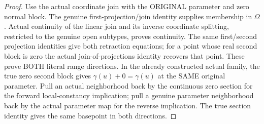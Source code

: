 \begin{proof}
Use the actual coordinate join with the ORIGINAL parameter and zero normal
block. The genuine first-projection/join identity supplies membership in
$\Omega$. Actual continuity of the linear join and its inverse coordinate
splitting, restricted to the genuine open subtypes, proves continuity.
The same first/second projection identities give both retraction equations;
for a point whose real second block is zero the actual join-of-projections
identity recovers that point. These prove BOTH literal range directions.
In the already constructed actual family, the true zero second block gives
$\gamma(u)+0=\gamma(u)$ at the SAME original parameter. Pull an actual neighborhood back by the
continuous zero section for the forward local-constancy implication; pull
a genuine parameter neighborhood back by the actual parameter map for
the reverse implication. The true section identity gives the same
basepoint in both directions.
\end{proof}


